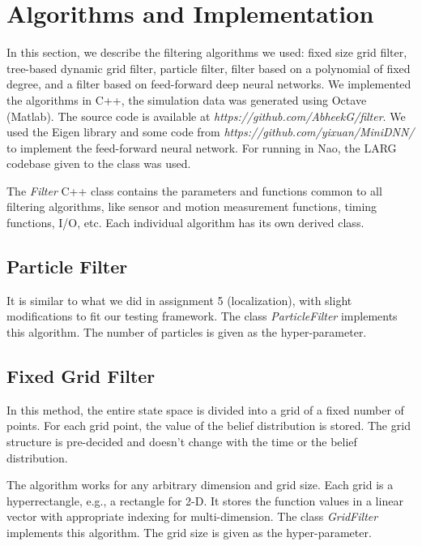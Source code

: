 \section{Algorithms and Implementation}
In this section, we describe the filtering algorithms we used: fixed size grid filter, tree-based dynamic grid filter, particle filter, filter based on a polynomial of fixed degree, and a filter based on feed-forward deep neural networks. We implemented the algorithms in C++, the simulation data was generated using Octave (Matlab). The source code is available at \textit{https://github.com/AbheekG/filter}. We used the Eigen library and some code from \textit{https://github.com/yixuan/MiniDNN/} to implement the feed-forward neural network. For running in Nao, the LARG codebase given to the class was used.

The \textit{Filter} C++ class contains the parameters and functions common to all filtering algorithms, like sensor and motion measurement functions, timing functions, I/O, etc. Each individual algorithm has its own derived class.

\subsection{Particle Filter}
It is similar to what we did in assignment 5 (localization), with slight modifications to fit our testing framework. The class \textit{ParticleFilter} implements this algorithm. The number of particles is given as the hyper-parameter.

\subsection{Fixed Grid Filter}\label{gf_def}
In this method, the entire state space is divided into a grid of a fixed number of points. For each grid point, the value of the belief distribution is stored. The grid structure is pre-decided and doesn't change with the time or the belief distribution.

The algorithm works for any arbitrary dimension and grid size. Each grid is a hyperrectangle, e.g., a rectangle for 2-D. It stores the function values in a linear vector with appropriate indexing for multi-dimension. The class \textit{GridFilter} implements this algorithm. The grid size is given as the hyper-parameter.

